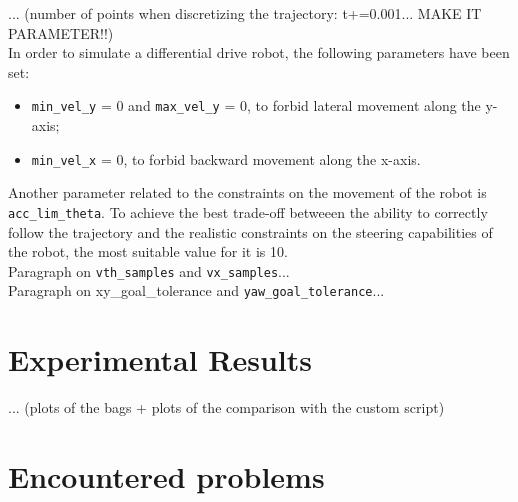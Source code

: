\documentclass[11pt,a4paper]{article}
\begin{document}
... (number of points when discretizing the trajectory: t+=0.001... MAKE IT PARAMETER!!)\\

In order to simulate a differential drive robot, the following parameters have been set:

\begin{itemize}
    \item \texttt{min\_vel\_y} = 0 and \texttt{max\_vel\_y} = 0, to forbid lateral movement along the y-axis;
    \item \texttt{min\_vel\_x} = 0, to forbid backward movement along the x-axis.\\
\end{itemize}

Another parameter related to the constraints on the movement of the robot is \texttt{acc\_lim\_theta}.
To achieve the best trade-off betweeen the ability to correctly follow the trajectory and the realistic
constraints on the steering capabilities of the robot, the most suitable value for it is 10.\\

Paragraph on \texttt{vth\_samples} and \texttt{vx\_samples}...\\

Paragraph on {xy\_goal\_tolerance} and \texttt{yaw\_goal\_tolerance}...\\







\section{Experimental Results}

... (plots of the bags + plots of the comparison with the custom script)




\section{Encountered problems}
\end{document}
